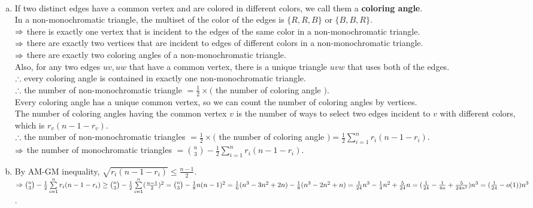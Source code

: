 \setcounter{pr}{0}
\begin{pr}$ $
\begin{enumerate}[(a)]
\item If two distinct edges have a common vertex and are colored in different colors, we call them a \textbf{coloring angle}.\\
In a non-monochromatic triangle, the multiset of the color of the edges is $\{R, R, B\}$ or $\{B, B, R\}$.\\
$\Rightarrow$ there is exactly one vertex that is incident to the edges of the same color in a non-monochromatic triangle.\\
$\Rightarrow$ there are exactly two vertices that are incident to edges of different colors in a non-monochromatic triangle.\\
$\Rightarrow$ there are exactly two coloring angles of a non-monochromatic triangle.\\
Also, for any two edges $uv, uw$ that have a common vertex, there is a unique triangle $uvw$ that uses both of the edges.\\
$\therefore$ every coloring angle is contained in exactly one non-monochromatic triangle.\\
$\therefore$ the number of non-monochromatic triangle $=\frac12\times($ the number of coloring angle $)$.\\
Every coloring angle has a unique common vertex, so we can count the number of coloring angles by vertices.\\
The number of coloring angles having the common vertex $v$ is the number of ways to select two edges incident to $v$ with different colors, which is $r_v(n-1-r_v)$.\\
$\therefore$ the number of non-monochromatic triangles $=\frac12\times($ the number of coloring angle $)=\frac12\sum_{i=1}^nr_i(n-1-r_i)$.\\
$\Rightarrow$ the number of monochromatic triangles $=\binom n3-\frac12\sum_{i=1}^nr_i(n-1-r_i)$.
\item By AM-GM inequality, $\sqrt{r_i(n-1-r_i)}\leq\frac{n-1}2$.\\
$\Rightarrow\binom n3-\frac12\sum\limits_{i=1}^nr_i(n-1-r_i)\geq\binom n3-\frac12\sum\limits_{i=1}^n(\frac{n-1}2)^2=\binom n3-\frac18n(n-1)^2=\frac16(n^3-3n^2+2n)-\frac18(n^3-2n^2+n)=\frac1{24}n^3-\frac14n^2+\frac5{24}n=(\frac1{24}-\frac1{4n}+\frac5{24n^2})n^3=(\frac1{24}-o(1))n^3$.
\end{enumerate}
\end{pr}
